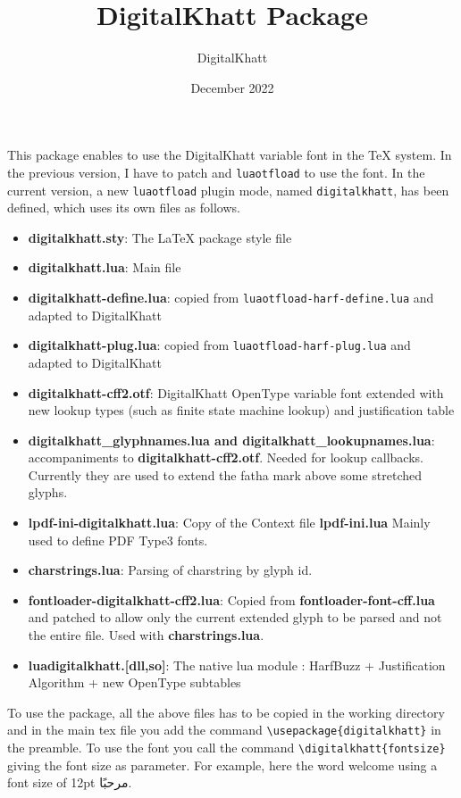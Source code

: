 \documentclass{article}
\title{DigitalKhatt \LuaLaTeX{} Package}
\date{December 2022}
\author{DigitalKhatt}
\newcommand{\DigitalKhatt}{DigitalKhatt}
\newcommand{\LuaOTFLoad}{\mbox{\texttt{luaotfload}}}
\begin{document}
\maketitle
This \LuaLaTeX{} package enables to use the \DigitalKhatt{} variable font in the \TeX{} system. In the previous version, I have to patch \LuaTeX{} and \LuaOTFLoad{} to use the font.
In the current version, a new \LuaOTFLoad{} plugin mode, named \mbox{\texttt{digitalkhatt}}, has been defined, which uses its own files as follows.
\begin{itemize}
  \item {\bf digitalkhatt.sty}: The \LaTeX{} package style file
  \item {\bf digitalkhatt.lua}: Main file
  \item {\bf digitalkhatt-define.lua}: copied from \mbox{\texttt{luaotfload-harf-define.lua}} and adapted to \DigitalKhatt{}
  \item {\bf digitalkhatt-plug.lua}: copied from \mbox{\texttt{luaotfload-harf-plug.lua}} and adapted to \DigitalKhatt{}
  \item {\bf digitalkhatt-cff2.otf}: DigitalKhatt OpenType variable font extended with new lookup types (such as finite state machine lookup) and justification table
  \item {\bf digitalkhatt\_glyphnames.lua and digitalkhatt\_lookupnames.lua}: accompaniments to {\bf digitalkhatt-cff2.otf}. Needed for lookup callbacks.
    Currently they are used to extend the fatha mark above some stretched glyphs.
  \item {\bf lpdf-ini-digitalkhatt.lua}: Copy of the Context file {\bf lpdf-ini.lua} Mainly  used to define PDF Type3 fonts.
  \item {\bf charstrings.lua}: Parsing of charstring by glyph id.
  \item {\bf fontloader-digitalkhatt-cff2.lua}: Copied from {\bf fontloader-font-cff.lua} and patched to allow only the current extended glyph to be parsed and not the entire file. Used with {\bf charstrings.lua}.
  \item {\bf luadigitalkhatt.[dll,so]}: The native lua module : HarfBuzz + Justification Algorithm + new OpenType subtables 
\end{itemize}
To use the package, all the above files has to be copied in the working directory and in the main tex file you add the command \verb!\usepackage{digitalkhatt}! in the preamble.
To use the font you call the command \verb!\digitalkhatt{fontsize}! giving the font size as parameter. For example, here the word welcome using a font size of 12pt {\digitalkhatt{12pt}مرحبًا}.
\end{document}

